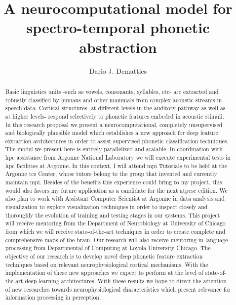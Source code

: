 \documentclass[11pt,a4paper]{article}
\title{A neurocomputational model for spectro-temporal phonetic abstraction}
\author[1]{Dario J. Dematties}
\affil[1]{Instituto de Ingeniería Biomédica, Facultad de Ingeniería, Universidad de Buenos Aires,
Ciudad Autonoma de Buenos Aires, Buenos Aires, Argentina}
\begin{document}
\linenumbers


\maketitle

\begin{abstract}
Basic linguistics units -such as vowels, consonants, syllables, etc-
are extracted and robustly classified by humans and other mammals
from complex acoustic streams in speech data.
Cortical structures -at different levels in the auditory pathway as well as at higher levels-
respond selectively to phonetic features embeded in acoustic stimuli.
In this research proposal we present a neurocomputational,
completely unsupervised and biologically plausible model
which establishes a new approach for deep feature extraction
architectures in order to assist supervised phonetic classification
techniques.
The model we present here is entirely parallelized and scalable.
In coordination with \gls{hpc} assistance from Argonne National Laboratory
we will execute experimental tests in \gls{hpc} facilities at Argonne.
In this context, I will attend \gls{mpi} Tutorials to be held at
the Argonne \gls{tcs} Center, whose tutors belong to the group
that invented and currently maintain \gls{mpi}.
Besides of the benefits this experience could bring to my project,
this would also favors my future application as a candidate
for the next \gls{atpesc} edition. 
We also plan to work with Assistant Computer Scientist at Argonne
in data analysis and visualization to explore visualization techniques
in order to inspect closely and thoroughly the evolution of
training and testing stages
in our systems.
This project will receive mentoring from the Department of Neurobiology at
University of Chicago from which we will receive state-of-the-art
techniques in order to create complete and comprehensive maps of the brain.
Our research will also receive mentoring in language processing
from Departmental of Computing at
Loyola University Chicago.
The objective of our research is to develop novel deep phonetic
feature extraction techniques based on relevant neurophysiological
cortical mechanisms.
With the implementation of these new approaches we expect to
perform at the level of state-of-the-art deep learning architectures. 
With these results we hope to direct the attention of new researches
towards neurophysiological characteristics which present
relevance for information processing in perception.
\end{abstract}
\end{document}
